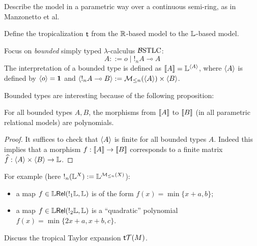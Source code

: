 
Describe the model in a parametric way over a continuous semi-ring, as in Manzonetto et al.





Define the tropicalization $\trop$ from the $\mathbb{R}$-based model
to the $\mathbb{L}$-based model.

Focus on \emph{bounded} simply typed $\lambda$-calculus $\mathcal{B}\mathrm{STLC}$:
$$
A::= o \mid !_{n}A \multimap A
$$
The interpretation of a bounded type is defined as 
$\llbracket A\rrbracket= \mathbb{L}^{\langle A\rangle}$, where 
$\langle A\rangle$ is defined by $\langle o\rangle=\mathbf{1}$ and 
$\langle !_{n}A\multimap B\rangle:= \mathcal{M}_{\leq n}(\langle A\rangle) \times \langle B\rangle$.

Bounded types are interesting
because of the following proposition:
\begin{proposition}
For all bounded types $A,B$, the morphisms from $\llbracket A\rrbracket$ to $\llbracket B\rrbracket$ (in all parametric relational models) are polynomials.


\end{proposition}
\begin{proof}
It suffices to check that $\langle A\rangle$ is finite for all bounded types $A$. Indeed this implies that a morphism $f:\llbracket A\rrbracket\to \llbracket B\rrbracket$ corresponds to a finite matrix $\widehat f: \langle A\rangle \times \langle B\rangle \to \mathbb{L}$.
\end{proof}

For example (here $!_{n}(\mathbb{L}^{X}):= \mathbb{L}^{\mathcal{M}_{\leq n}(X)}$):
\begin{itemize}
\item a map $f\in \mathbb{L}\mathsf{Rel}( !_{1}\mathbb{L}, \mathbb{L})$ is of the form $f(x)=\min \{x+a,b\}$;

\item a map $f\in \mathbb{L}\mathsf{Rel}(!_{2}\mathbb{L}, \mathbb{L})$ is a ``quadratic'' polynomial $f(x)=\min\{2x+a, x+b, c\}$.



\end{itemize}




Discuss the tropical Taylor expansion $\mathsf{t} \mathcal{T}(M)$. 

